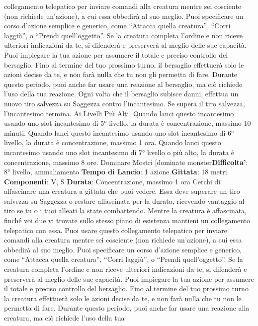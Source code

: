 \begin{multicols}{2}
collegamento telepatico per inviare comandi alla
creatura mentre sei cosciente (non richiede un’azione),
a cui essa obbedirà al suo meglio. Puoi specificare un
corso d’azione semplice e generico, come “Attacca
quella creatura”, “Corri laggiù”, o “Prendi quell’oggetto”.
Se la creatura completa l’ordine e non riceve ulteriori
indicazioni da te, si difenderà e preserverà al meglio
delle sue capacità.
Puoi impiegare la tua azione per assumere il totale e
preciso controllo del bersaglio. Fino al termine del tuo
prossimo turno, il bersaglio effettuerà solo le azioni
decise da te, e non farà nulla che tu non gli permetta di
fare. Durante questo periodo, puoi anche far usare una
reazione al bersaglio, ma ciò richiede l’uso della tua
reazione.
Ogni volta che il bersaglio subisce danni, effettua un
nuovo tiro salvezza su Saggezza contro l’incantesimo.
Se supera il tiro salvezza, l’incantesimo termina.
Ai Livelli Più Alti. Quando lanci questo incantesimo
usando uno slot incantesimo di 5° livello, la durata è
concentrazione, massimo 10 minuti. Quando lanci
questo incantesimo usando uno slot incantesimo di 6°
livello, la durata è concentrazione, massimo 1 ora.
Quando lanci questo incantesimo usando uno slot
incantesimo di 7° livello o più alto, la durata è
concentrazione, massimo 8 ore.
Dominare Mostri
[dominate monster\textbf{Difficolta'}:
8° livello, ammaliamento
\textbf{Tempo di Lancio}: 1 azione
\textbf{Gittata}: 18 metri
\textbf{Componenti}: V, S
\textbf{Durata}: Concentrazione, massimo 1 ora
Cerchi di affascinare una creatura a gittata che puoi
vedere. Essa deve superare un tiro salvezza su
Saggezza o restare affascinata per la durata, ricevendo
vantaggio al tiro se tu o i tuoi alleati la state
combattendo.
Mentre la creatura è affascinata, finché voi due vi
trovate sullo stesso piano di esistenza mantieni un
collegamento telepatico con essa. Puoi usare questo
collegamento telepatico per inviare comandi alla
creatura mentre sei cosciente (non richiede un’azione),
a cui essa obbedirà al suo meglio. Puoi specificare un
corso d’azione semplice e generico, come “Attacca
quella creatura”, “Corri laggiù”, o “Prendi quell’oggetto”.
Se la creatura completa l’ordine e non riceve ulteriori
indicazioni da te, si difenderà e preserverà al meglio
delle sue capacità.
Puoi impiegare la tua azione per assumere il totale e
preciso controllo del bersaglio. Fino al termine del tuo
prossimo turno la creatura effettuerà solo le azioni
decise da te, e non farà nulla che tu non le permetta di
fare. Durante questo periodo, puoi anche far usare una
reazione alla creatura, ma ciò richiede l’uso della tua

\end{multicols}
